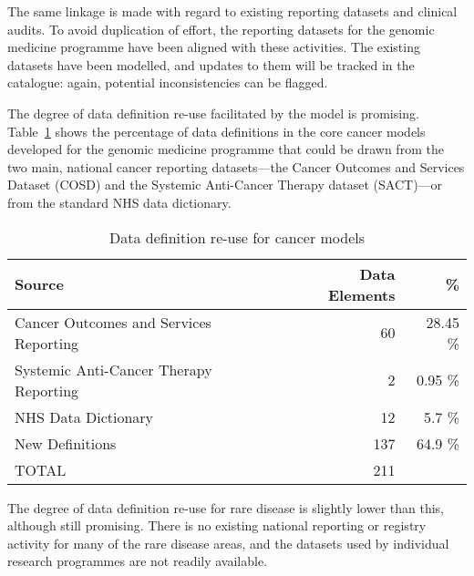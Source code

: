 The same linkage is made with regard to existing reporting datasets
and clinical audits.  To avoid duplication of effort, the reporting
datasets for the genomic medicine programme have been aligned with
these activities.  The existing datasets have been modelled, and
updates to them will be tracked in the catalogue: again, potential
inconsistencies can be flagged.

The degree of data definition re-use facilitated by the model is
promising.  Table~\ref{table:reuse} shows the percentage of data
definitions in the core cancer models developed for the genomic
medicine programme that could be drawn from the two main, national
cancer reporting datasets---the Cancer Outcomes and Services Dataset
(COSD) and the Systemic Anti-Cancer Therapy dataset (SACT)---or from
the standard NHS data dictionary.

\begin{table}[h]
  \caption{Data definition re-use for cancer models}
  \label{table:reuse}
  \begin{tabular}{lrr}
    \hline
    Source &  Data Elements & \%  \\ 
    \hline
    Cancer Outcomes and Services Reporting  & 60 & 28.45 \% \\
    Systemic Anti-Cancer Therapy Reporting & 2 & 0.95 \% \\
    NHS Data Dictionary & 12 & 5.7 \% \\
    New Definitions & 137 & 64.9 \% \\
    \hline
    TOTAL & 211
  \end{tabular}
\end{table}

The degree of data definition re-use for rare disease is slightly
lower than this, although still promising.  There is no existing
national reporting or registry activity for many of the rare disease
areas, and the datasets used by individual research programmes are not
readily available.   

